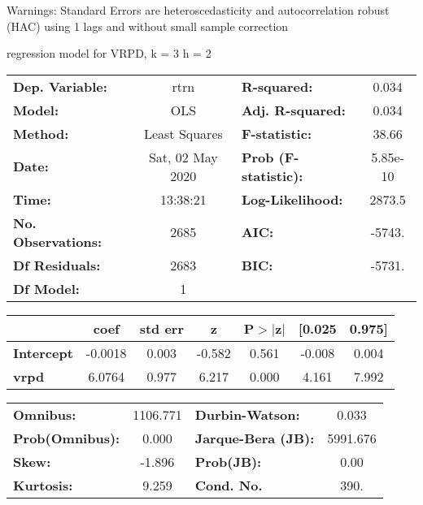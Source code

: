 Warnings: \newline
 [1] Standard Errors are heteroscedasticity and autocorrelation robust (HAC) using 1 lags and without small sample correction\ 

regression model for VRPD, k = 3 h = 2\begin{center}
\begin{tabular}{lclc}
\toprule
\textbf{Dep. Variable:}    &       rtrn       & \textbf{  R-squared:         } &     0.034   \\
\textbf{Model:}            &       OLS        & \textbf{  Adj. R-squared:    } &     0.034   \\
\textbf{Method:}           &  Least Squares   & \textbf{  F-statistic:       } &     38.66   \\
\textbf{Date:}             & Sat, 02 May 2020 & \textbf{  Prob (F-statistic):} &  5.85e-10   \\
\textbf{Time:}             &     13:38:21     & \textbf{  Log-Likelihood:    } &    2873.5   \\
\textbf{No. Observations:} &        2685      & \textbf{  AIC:               } &    -5743.   \\
\textbf{Df Residuals:}     &        2683      & \textbf{  BIC:               } &    -5731.   \\
\textbf{Df Model:}         &           1      & \textbf{                     } &             \\
\bottomrule
\end{tabular}
\begin{tabular}{lcccccc}
                   & \textbf{coef} & \textbf{std err} & \textbf{z} & \textbf{P$> |$z$|$} & \textbf{[0.025} & \textbf{0.975]}  \\
\midrule
\textbf{Intercept} &      -0.0018  &        0.003     &    -0.582  &         0.561        &       -0.008    &        0.004     \\
\textbf{vrpd}      &       6.0764  &        0.977     &     6.217  &         0.000        &        4.161    &        7.992     \\
\bottomrule
\end{tabular}
\begin{tabular}{lclc}
\textbf{Omnibus:}       & 1106.771 & \textbf{  Durbin-Watson:     } &    0.033  \\
\textbf{Prob(Omnibus):} &   0.000  & \textbf{  Jarque-Bera (JB):  } & 5991.676  \\
\textbf{Skew:}          &  -1.896  & \textbf{  Prob(JB):          } &     0.00  \\
\textbf{Kurtosis:}      &   9.259  & \textbf{  Cond. No.          } &     390.  \\
\bottomrule
\end{tabular}
\end{center}


